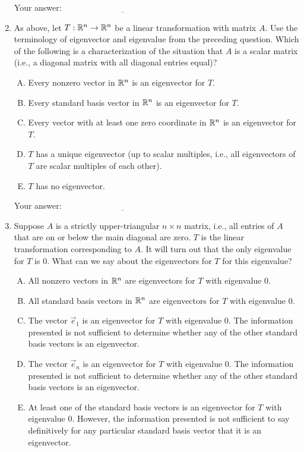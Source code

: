\documentclass[10pt]{amsart}
\begin{document}
\begin{enumerate}
  \vspace{0.1in}
  Your answer: $\underline{\qquad\qquad\qquad\qquad\qquad\qquad\qquad}$
  \vspace{0.1in}

\item As above, let $T: \mathbb{R}^n \to \mathbb{R}^n$ be a linear transformation with
  matrix $A$. Use the terminology of eigenvector and eigenvalue from
  the preceding question. Which of the following is a characterization
  of the situation that $A$ is a scalar matrix (i.e., a diagonal matrix
  with all diagonal entries equal)?

  \begin{enumerate}[(A)]
  \item Every nonzero vector in $\mathbb{R}^n$ is an eigenvector for $T$.
  \item Every standard basis vector in $\mathbb{R}^n$ is an eigenvector for $T$.
  \item Every vector with at least one zero coordinate in $\mathbb{R}^n$ is an
    eigenvector for $T$.
  \item $T$ has a unique eigenvector (up to scalar multiples, i.e.,
    all eigenvectors of $T$ are scalar multiples of each other).
  \item $T$ has no eigenvector.
  \end{enumerate}

  \vspace{0.1in}
  Your answer: $\underline{\qquad\qquad\qquad\qquad\qquad\qquad\qquad}$
  \vspace{0.1in}

\item Suppose $A$ is a strictly upper-triangular $n \times n$ matrix,
  i.e., all entries of $A$ that are on or below the main diagonal are
  zero. $T$ is the linear transformation corresponding to $A$. It will
  turn out that the only eigenvalue for $T$ is $0$. What can we say
  about the eigenvectors for $T$ for this eigenvalue?

  \begin{enumerate}[(A)]
  \item All nonzero vectors in $\mathbb{R}^n$ are eigenvectors for $T$ with
    eigenvalue $0$.
  \item All standard basis vectors in $\mathbb{R}^n$ are eigenvectors for $T$
    with eigenvalue $0$.
  \item The vector $\vec{e}_1$ is an eigenvector for $T$ with
    eigenvalue $0$. The information presented is not sufficient to
    determine whether any of the other standard basis vectors is an
    eigenvector.
  \item The vector $\vec{e}_n$ is an eigenvector for $T$ with
    eigenvalue $0$. The information presented is not sufficient to
    determine whether any of the other standard basis vectors is an
    eigenvector.
  \item At least one of the standard basis vectors is an eigenvector
    for $T$ with eigenvalue $0$. However, the information presented is
    not sufficient to say definitively for any particular standard
    basis vector that it is an eigenvector.
  \end{enumerate}


\end{enumerate}
\end{document}
